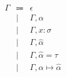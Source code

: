 \documentclass[12pt]{article}
\begin{document}
\pagestyle{empty}

\begin{align*}
    \begin{array}{rcl}
        \Gamma
        &\Coloneqq &\epsilon \\
        &\mid &\Gamma, \alpha \\
        &\mid &\Gamma, x: \sigma \\
        &\mid &\Gamma, \hat{\alpha} \\
        &\mid &\Gamma, \hat{\alpha} = \tau \\
        &\mid &\Gamma, \alpha \mapsto \hat{\alpha}
    \end{array}
\end{align*}
\end{document}
